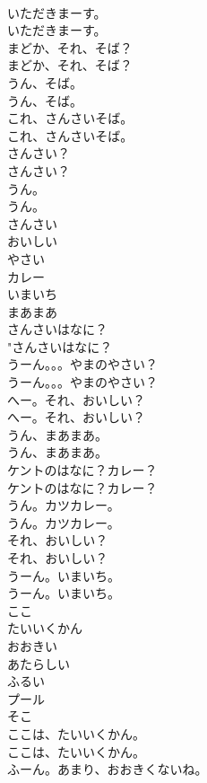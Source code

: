 \documentclass[8pt]{extreport}
\begin{document}
\begin{CJK}{UTF8}{min}
\\	いただきまーす。	
\\	いただきまーす。 
\\	まどか、それ、そば？	
\\	まどか、それ、そば？ 
\\	うん、そば。	
\\	うん、そば。 
\\	これ、さんさいそば。	
\\	これ、さんさいそば。 
\\	さんさい？	
\\	さんさい？ 
\\	うん。	
\\	うん。 
\\	さんさい
\\	おいしい
\\	やさい
\\	カレー
\\	いまいち
\\	まあまあ
\\	さんさいはなに？	
\\	"さんさいはなに？ 
\\	うーん。。。やまのやさい？	
\\	うーん。。。やまのやさい？ 
\\	へー。それ、おいしい？	
\\	へー。それ、おいしい？ 
\\	うん、まあまあ。	
\\	うん、まあまあ。 
\\	ケントのはなに？カレー？	
\\	ケントのはなに？カレー？ 
\\	うん。カツカレー。	
\\	うん。カツカレー。 
\\	それ、おいしい？	
\\	それ、おいしい？ 
\\	うーん。いまいち。	
\\	うーん。いまいち。 
\\	ここ
\\	たいいくかん
\\	おおきい
\\	あたらしい
\\	ふるい
\\	プール
\\	そこ
\\	ここは、たいいくかん。	
\\	ここは、たいいくかん。 
\\	ふーん。あまり、おおきくないね。	

\end{CJK}
\end{document}
